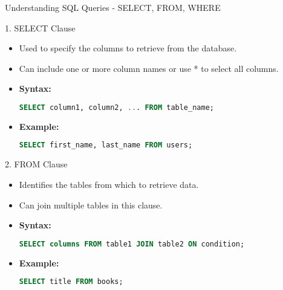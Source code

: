 \documentclass[aspectratio=169]{beamer}
\begin{document}
\begin{frame}[fragile]{Understanding SQL Queries - SELECT, FROM, WHERE}
    \begin{block}{1. SELECT Clause}
        \begin{itemize}
            \item Used to specify the columns to retrieve from the database.
            \item Can include one or more column names or use * to select all columns.
            \item \textbf{Syntax:}
            \begin{lstlisting}[language=SQL]
SELECT column1, column2, ... FROM table_name;
            \end{lstlisting}
            \item \textbf{Example:}
            \begin{lstlisting}[language=SQL]
SELECT first_name, last_name FROM users;
            \end{lstlisting}
        \end{itemize}
    \end{block}
    
    \begin{block}{2. FROM Clause}
        \begin{itemize}
            \item Identifies the tables from which to retrieve data.
            \item Can join multiple tables in this clause.
            \item \textbf{Syntax:}
            \begin{lstlisting}[language=SQL]
SELECT columns FROM table1 JOIN table2 ON condition;
            \end{lstlisting}
            \item \textbf{Example:}
            \begin{lstlisting}[language=SQL]
SELECT title FROM books;
            \end{lstlisting}
        \end{itemize}
    \end{block}
\end{frame}
\end{document}

